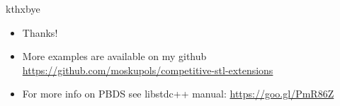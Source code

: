 \documentclass[12pt,presentation,hyperref={unicode},aspectratio=169]{beamer}
\begin{document}
\begin{frame}{kthxbye}
  \begin{itemize}
    \item Thanks!
    \item More examples are available on my github \url{https://github.com/moskupols/competitive-stl-extensions}
    \item For more info on PBDS see libstdc++ manual: \url{https://goo.gl/PmR86Z}
  \end{itemize}
\end{frame}
\end{document}

